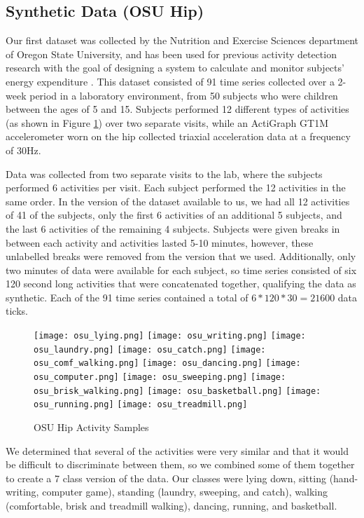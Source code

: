 \subsection{Synthetic Data (OSU Hip)}
Our first dataset was collected by the Nutrition and Exercise Sciences department of
Oregon State University, and has been used for previous activity detection research
with the goal of designing a system to calculate and monitor subjects' energy expenditure
\cite{trost12} \cite{zheng12}.
This dataset consisted of 91 time series collected over a 2-week period in a
laboratory environment, from 50 subjects who were children between the ages of 5 and 15.
Subjects performed 12 different types of activities (as shown in Figure \ref{fig:osu_activities})
over two separate visits, while an ActiGraph GT1M accelerometer worn on the hip 
collected triaxial acceleration data at a frequency of 30Hz.

Data was collected from two separate visits to the lab, where the subjects performed 6 activities per visit.
Each subject performed the 12 activities in the same order.
In the version of the dataset available to us, we had all 12 activities of
41 of the subjects, only the first 6 activities of an additional 5 subjects,
and the last 6 activities of the remaining 4 subjects.
Subjects were given breaks in between each activity and activities lasted 5-10
minutes, however, these unlabelled breaks were removed from the version that we
used. Additionally, only two minutes of data were available for each subject, so 
time series consisted of six 120 second long activities that were concatenated together,
qualifying the data as synthetic. Each of the 91 time series contained a total of
$6*120*30 = 21600$ data ticks.

\begin{figure}
 \centering
 \texttt{[image: osu\_lying.png]}
 \texttt{[image: osu\_writing.png]}
 \texttt{[image: osu\_laundry.png]}
 \texttt{[image: osu\_catch.png]}
 \texttt{[image: osu\_comf\_walking.png]}
 \texttt{[image: osu\_dancing.png]}
 \texttt{[image: osu\_computer.png]}
 \texttt{[image: osu\_sweeping.png]}
 \texttt{[image: osu\_brisk\_walking.png]}
 \texttt{[image: osu\_basketball.png]}
 \texttt{[image: osu\_running.png]}
 \texttt{[image: osu\_treadmill.png]}
 \caption{OSU Hip Activity Samples}
 \label{fig:osu_activities}
\end{figure}

We determined that several of the activities were very similar and that
it would be difficult to discriminate between them, so we combined some of them together to
create a 7 class version of the data.
Our classes were lying down, sitting (hand-writing, computer game),
standing (laundry, sweeping, and catch), walking (comfortable, brisk and treadmill walking),
dancing, running, and basketball.

